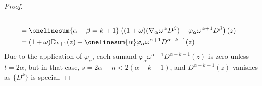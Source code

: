 \documentclass[11pt]{amsart}
\theoremstyle{plain}
\theoremstyle{definition}
\let\phi\varphi
\theoremstyle{plain}
\newcommand{\twist}{\omega}
\newcommand{\Nabla}{\nabla}
\begin{document}
\begin{second quadrant homotopy}
\begin{proof}
\begin{alignat*}{2}
\\
&=
\onelinesum{\alpha-\beta=k+1} \left((1+\twist)(\Nabla_\alpha\twist^\alpha D^\beta)+ \phi_{\alpha}\twist^{\alpha+1} D^\beta\right)(z)%
\\
&=
(1+\twist)\mathbb{D}_{k+1}(z)+\onelinesum{\alpha} \phi_{\alpha}\twist^{\alpha+1} D^{\alpha-k-1}(z)%
\end{alignat*}
Due to the application of $\phi_{\alpha}$, each sumand $\phi_{\alpha}\twist^{\alpha+1} D^{\alpha-k-1}(z)$ is zero unless $t=2\alpha$, but in that case, $s=2\alpha-n<2(\alpha-k-1)$, and $D^{\alpha-k-1}(z)$ vanishes as $\{D^k\}$ is special.
%
\end{proof}


















\end{second quadrant homotopy}
\end{document}
